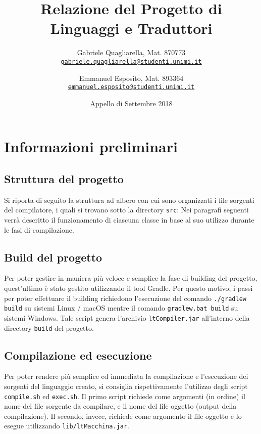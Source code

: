 \documentclass[10pt,a4paper]{article}
\date{Appello di Settembre 2018}
\author{
  Gabriele Quagliarella, Mat. 870773\\
  \texttt{\href{mailto:gabriele.quagliarella@studenti.unimi.it}{gabriele.quagliarella@studenti.unimi.it}}
  \and 
  Emmanuel Esposito, Mat. 893364\\
  \texttt{\href{mailto:emmanuel.esposito@studenti.unimi.it}{emmanuel.esposito@studenti.unimi.it}}
}
\title{Relazione del Progetto di Linguaggi e Traduttori}
\begin{document}
\maketitle
\tableofcontents

\pagebreak

\section{Informazioni preliminari}

\subsection{Struttura del progetto}
Si riporta di seguito la struttura ad albero con cui sono organizzati i file sorgenti del compilatore, i quali si trovano sotto la directory \texttt{src}:
\vspace{6pt}
\vspace{8pt}
Nei paragrafi seguenti verrà descritto il funzionamento di ciascuna classe in base al suo utilizzo durante le fasi di compilazione.

\subsection{Build del progetto}
Per poter gestire in maniera più veloce e semplice la fase di building del progetto, quest'ultimo è stato gestito utilizzando il tool Gradle. Per questo motivo, i passi per poter effettuare il building richiedono l'esecuzione del comando \texttt{./gradlew build} su sistemi Linux / macOS mentre il comando \texttt{gradlew.bat build} su sistemi Windows.
Tale script genera l'archivio \texttt{ltCompiler.jar} all'interno della directory \texttt{build} del progetto.

\subsection{Compilazione ed esecuzione}
Per poter rendere più semplice ed immediata la compilazione e l'esecuzione dei sorgenti del linguaggio creato, si consiglia rispettivamente l'utilizzo degli script \texttt{compile.sh} ed \texttt{exec.sh}. Il primo script richiede come argomenti (in ordine) il nome del file sorgente da compilare, e il nome del file oggetto (output della compilazione). Il secondo, invece, richiede come argomento il file oggetto e lo esegue utilizzando \texttt{lib/ltMacchina.jar}.
\end{document}
